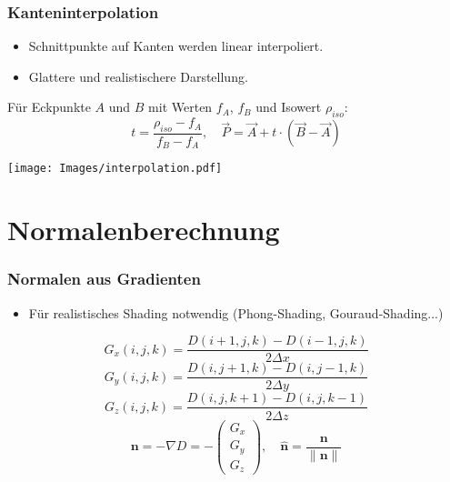 \documentclass{beamer}
\begin{document}
\begin{frame}[t]
  \frametitle{Kanteninterpolation}
  \begin{itemize}
    \item Schnittpunkte auf Kanten werden linear interpoliert.
    \item Glattere und realistischere Darstellung.
  \end{itemize}
  \vspace{0.5em}
  Für Eckpunkte $A$ und $B$ mit Werten $f_A$, $f_B$ und Isowert $\rho_{iso}$:
  \[
    t = \frac{\rho_{iso} - f_A}{f_B - f_A}, \quad
    \vec{P} = \vec{A} + t \cdot (\vec{B} - \vec{A})
  \]
  \vspace{0.5em}
\noindent
\begin{minipage}{\linewidth}
  \hspace{1cm}\texttt{[image: Images/interpolation.pdf]}
\end{minipage}
\end{frame}

\section{Normalenberechnung}
\begin{frame}
  \frametitle{Normalen aus Gradienten}
  \begin{itemize}
    \item Für realistisches Shading notwendig (Phong-Shading, Gouraud-Shading...)
  \end{itemize}
  \begin{center}
    \[
      G_x(i,j,k) = \frac{D(i+1, j, k) - D(i-1, j, k)}{2 \Delta x}
    \]
    \[
      G_y(i,j,k) = \frac{D(i, j+1, k) - D(i, j-1, k)}{2 \Delta y}
    \]
    \[
      G_z(i,j,k) = \frac{D(i, j, k+1) - D(i, j, k-1)}{2 \Delta z}
    \]
    \[
      \mathbf{n} = -\nabla D = - \begin{pmatrix} G_x \\ G_y \\ G_z \end{pmatrix}, \quad
      \hat{\mathbf{n}} = \frac{\mathbf{n}}{\|\mathbf{n}\|}
    \]
  \end{center}
\end{frame}

\end{document}

